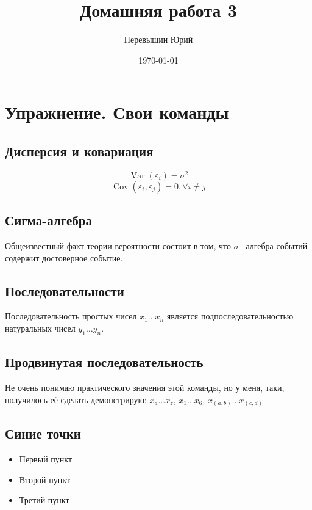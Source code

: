 \documentclass[12pt, a4paper]{article}
\title{Домашняя работа 3}
\date{\today}
\author{Перевышин Юрий}
\theoremstyle{plain}              %
\theoremstyle{definition}         %
\DeclareMathOperator{\V}{Var}
\DeclareMathOperator{\cov}{Cov}
\begin{document}
	
	\maketitle
	
	\section{Упражнение. Свои команды}
	\subsection{Дисперсия и ковариация}
	$$\V(\varepsilon_i)=\sigma^2$$
	$$\cov(\varepsilon_i,\varepsilon_j)=0, \forall i\neq j$$
	\subsection{Сигма-алгебра}
	\newcommand{\s}{{\ensuremath{\sigma}}-~алгебра }
	Общеизвестный факт теории вероятности состоит в том, что  \s событий содержит достоверное событие.
	\subsection{Последовательности}
	\newcommand{\seqx}{{\ensuremath{x_1 \ldots x_n}} }
	\newcommand{\seqy}{{\ensuremath{y_1 \ldots y_n}}}
	Последовательность простых чисел \seqx является подпоследовательностью натуральных чисел \seqy.
	\subsection{Продвинутая последовательность}
	\newcommand{\seq}[2]{\ensuremath{x_{#1}\ldots x_{#2}}}
	Не очень понимаю практического значения этой команды, но у меня, таки, получилось её сделать
	демонстрирую: \seq{a}{z}, \seq{1}{6}, \seq{(a,b)}{(c,d)}
	\subsection{Синие точки}
	\begin{itemize} [label=\textcolor{blue}{\textbullet}] %
		\item  Первый пункт 
		\item Второй пункт
		\item Третий пункт
	\end{itemize}
	
\end{document}
